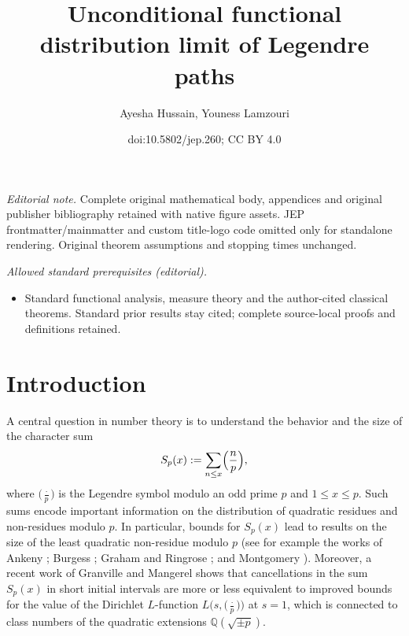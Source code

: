 \documentclass[10pt]{amsart}
\title{Unconditional functional distribution limit of Legendre paths}
\author{Ayesha Hussain, Youness Lamzouri}
\date{doi:10.5802/jep.260; CC BY 4.0}
\theoremstyle{plain}
\theoremstyle{definition}
\newcommand{\Legendre}[2]{\Bigl(\dfrac{#1}{#2}\Bigr)}
\begin{document}
\maketitle
\noindent\textit{Editorial note.} Complete original mathematical body, appendices and original publisher bibliography retained with native figure assets. JEP frontmatter/mainmatter and custom title-logo code omitted only for standalone rendering. Original theorem assumptions and stopping times unchanged.\par\medskip
\noindent\textit{Allowed standard prerequisites (editorial).}\begin{itemize}
\item Standard functional analysis, measure theory and the author-cited classical theorems. Standard prior results stay cited; complete source-local proofs and definitions retained.
\end{itemize}\medskip
\vspace*{-1.2\baselineskip}
\tableofcontents


\vspace*{-2.2\baselineskip}\vskip0pt
\section{Introduction}\label{s: introduction_real_characters}

A central question in number theory is to understand the behavior and the size of the character sum\vspace*{-3pt}
\begin{equation}\label{eq: definition of character sum}
S_p(x) := \sum_{n \leq x} \Legendre{n}{p},
\end{equation}
where $\bigl(\frac{\cdot}{p}\bigr)$ is the Legendre symbol modulo an odd prime $p$ and $1\leq x\leq p$.
Such sums encode important
information on the distribution of quadratic residues and non-residues modulo $p$. In particular, bounds for $S_p(x)$ lead to results on the size of the least quadratic non-residue
modulo $p$ (see for example the works of Ankeny \cite{An};
Burgess \cite{Bu}; Graham and Ringrose \cite{GrRi}; and Montgomery
\cite{Mo}). Moreover, a recent work of Granville and Mangerel \cite{GrMa} shows that cancellations in the sum $S_p(x)$ in short initial intervals are more or less equivalent to improved bounds for the value of the Dirichlet $L$-function $L\big(s, \big(\frac{\cdot}{p}\big)\big)$ at $s=1$, which is connected to class numbers of the quadratic extensions $\mathbb{Q}(\sqrt{\pm p})$.
\end{document}
